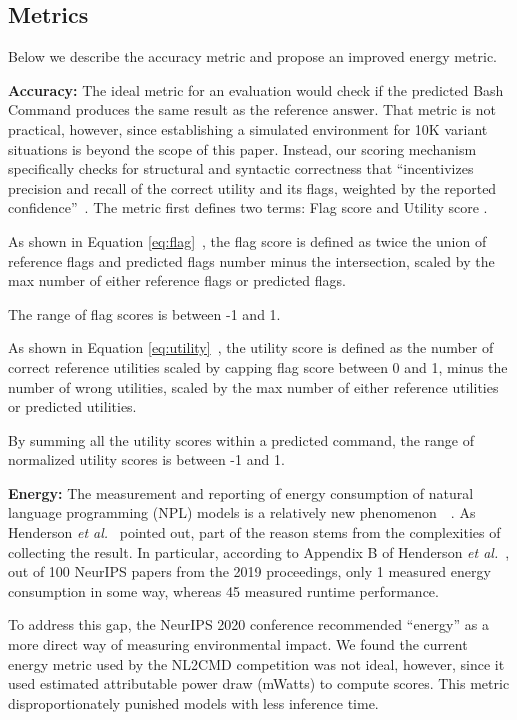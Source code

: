 \documentclass{river-journal}
\begin{document}
\subsection{Metrics} 
Below we describe the accuracy metric and propose an improved energy metric.

\label{metricerr.metric}
\textbf{Accuracy:} The ideal metric for an evaluation would check if the predicted Bash Command produces the same result as the reference answer. That metric is not practical, however, since establishing a simulated environment for 10K variant situations is beyond the scope of this paper. Instead, our scoring mechanism specifically checks for structural and syntactic correctness that ``incentivizes precision and recall of the correct utility and its flags, weighted by the reported confidence''~\cite{Agarwal2021NeurIPS2N}. The metric first defines two terms: Flag score  and Utility score . 

As shown in Equation \ref{eq:flag}~\cite{Agarwal2021NeurIPS2N}, the flag score is defined as twice the union of reference flags and predicted flags number minus the intersection, scaled by the max number of either reference flags or predicted flags. 

The range of flag scores is between -1 and 1. 

As shown in Equation \ref{eq:utility}~\cite{Agarwal2021NeurIPS2N}, the utility score is defined as the number of correct reference utilities scaled by capping flag score between 0 and 1, minus the number of wrong utilities, scaled by the max number of either reference utilities or predicted utilities.
\begin{small}

\end{small}
By summing all the utility scores within a predicted command, the range of normalized utility scores is between -1 and 1.

\textbf{Energy:} The measurement and reporting of energy consumption of natural language programming (NPL) models is a relatively new phenomenon~\cite{Strubell2019EnergyAP}~\cite{Cao2020TowardsAA}. As Henderson \textit{et al.}~\cite{henderson2020systematic} pointed out, part of the reason stems from the complexities of collecting the result. In particular, according to Appendix B of Henderson \textit{et al.}~\cite{henderson2020systematic}, out of 100 NeurIPS papers from the 2019 proceedings, only 1 measured energy consumption in some way, whereas 45 measured runtime performance. 

To address this gap, the NeurIPS 2020 conference recommended ``energy'' as a more direct way of measuring environmental impact.	We found the current energy metric used by the NL2CMD competition was not ideal, however, since it used estimated attributable power draw (mWatts) to compute scores. This metric disproportionately punished models with less inference time.	
\end{document}
